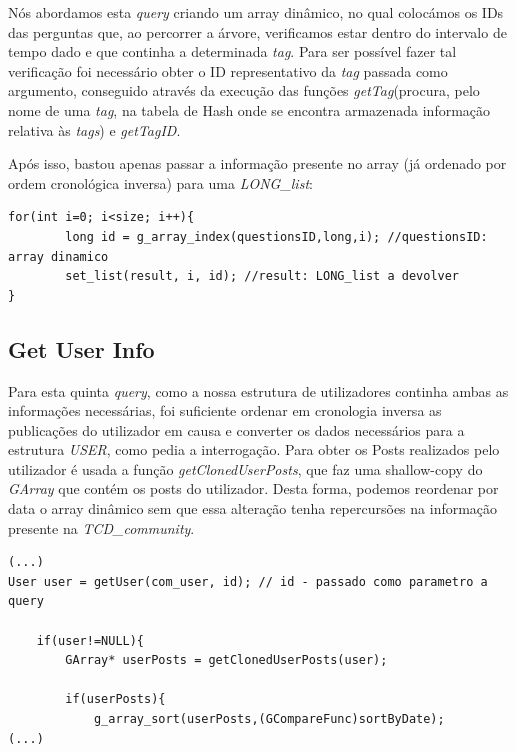 \documentclass[a4paper, 11pt, oneside]{article}
\begin{document}
Nós abordamos esta \textit{query} criando um array dinâmico, no qual colocámos os IDs das perguntas que, ao percorrer a árvore, verificamos estar dentro do intervalo de tempo dado e que continha a determinada \textit{tag}. Para ser possível fazer tal verificação foi necessário obter o ID representativo da \textit{tag} passada como argumento, conseguido através da execução das funções \textit{getTag}(procura, pelo nome de uma \textit{tag}, na tabela de Hash onde se encontra armazenada informação relativa às \textit{tags}) e \textit{getTagID}.

Após isso, bastou apenas passar a informação presente no array (já ordenado por ordem cronológica inversa) para uma \textit{LONG\_list}:

\begin{lstlisting}[caption=Query 4 - array dinâmico para LONG\_list]
for(int i=0; i<size; i++){
		long id = g_array_index(questionsID,long,i); //questionsID: array dinamico
		set_list(result, i, id); //result: LONG_list a devolver
}
\end{lstlisting}

\subsection{Get User Info}
Para esta quinta \textit{query}, como a nossa estrutura de utilizadores continha ambas as informações necessárias, foi suficiente ordenar em cronologia inversa as publicações do utilizador em causa e converter os dados necessários para a estrutura \textit{USER}, como pedia a interrogação. Para obter os Posts realizados pelo utilizador é usada a função \textit{getClonedUserPosts}, que faz uma shallow-copy do \textit{GArray} que contém os posts do utilizador. Desta forma, podemos reordenar por data o array dinâmico sem que essa alteração tenha repercursões na informação presente na \textit{TCD\_community}.


\begin{lstlisting}[caption=Query 5 - preservação do encapsulamento]
(...)
User user = getUser(com_user, id); // id - passado como parametro a query
	
	if(user!=NULL){
		GArray* userPosts = getClonedUserPosts(user);
		
		if(userPosts){
			g_array_sort(userPosts,(GCompareFunc)sortByDate);
(...)
\end{lstlisting}
\end{document}
